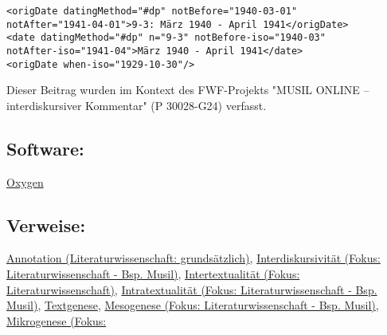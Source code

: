 \documentclass{article}
\begin{document}
        \begin{verbatim}<origDate datingMethod="#dp" notBefore="1940-03-01"
notAfter="1941-04-01">9-3: März 1940 - April 1941</origDate>        
<date datingMethod="#dp" n="9-3" notBefore-iso="1940-03"
notAfter-iso="1941-04">März 1940 - April 1941</date>
<origDate when-iso="1929-10-30"/>\end{verbatim}Dieser Beitrag wurden im Kontext des FWF-Projekts "MUSIL ONLINE – interdiskursiver Kommentar" 
                  (P 30028-G24) verfasst.\subsection*{Software:}\href{http://oxygenxml.com/}{Oxygen}\subsection*{Verweise:}\href{https://gams.uni-graz.at/o:konde.17}{Annotation (Literaturwissenschaft:
                           grundsätzlich)}, \href{https://gams.uni-graz.at/o:konde.19}{Interdiskursivität (Fokus:
                           Literaturwissenschaft - Bsp. Musil)}, \href{https://gams.uni-graz.at/o:konde.20}{Intertextualität (Fokus:
                           Literaturwissenschaft)}, \href{https://gams.uni-graz.at/o:konde.21}{Intratextualität (Fokus:
                           Literaturwissenschaft - Bsp. Musil)}, \href{https://gams.uni-graz.at/o:konde.28}{Textgenese}, \href{https://gams.uni-graz.at/o:konde.24}{Mesogenese (Fokus:
                           Literaturwissenschaft - Bsp. Musil)}, \href{https://gams.uni-graz.at/o:konde.26}{Mikrogenese (Fokus:
}
\end{document}
